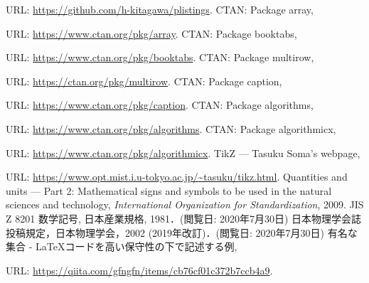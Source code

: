 \documentclass[uplatex]{jsreport}
\begin{document}
\begin{thebibliography}{99}
  URL: \url{https://github.com/h-kitagawa/plistings}.
   CTAN: Package array, \par
  URL: \url{https://www.ctan.org/pkg/array}.
   CTAN: Package booktabs, \par
  URL: \url{https://www.ctan.org/pkg/booktabs}.
   CTAN: Package multirow, \par
  URL: \url{https://ctan.org/pkg/multirow}.
   CTAN: Package caption, \par
  URL: \url{https://www.ctan.org/pkg/caption}.
   CTAN: Package algorithms, \par
  URL: \url{https://www.ctan.org/pkg/algorithms}.
   CTAN: Package algorithmicx, \par
  URL: \url{https://www.ctan.org/pkg/algorithmicx}.
   TikZ --- Tasuku Soma's webpage, \par
  URL: \url{https://www.opt.mist.i.u-tokyo.ac.jp/~tasuku/tikz.html}.
   Quantities and units --- Part 2: Mathematical signs and symbols to be used in the natural sciences and technology, \textit{International Organization for Standardization}, 2009.
   JIS Z 8201 数学記号, 日本産業規格, 1981．(閲覧日: 2020年7月30日)
   日本物理学会誌投稿規定，日本物理学会，2002 (2019年改訂)．(閲覧日: 2020年7月30日)
   有名な集合 - LaTeXコードを高い保守性の下で記述する例, \par
  URL: \url{https://qiita.com/gfngfn/items/cb76cf01c372b7ccb4a9}.
\end{thebibliography}
\end{document}
